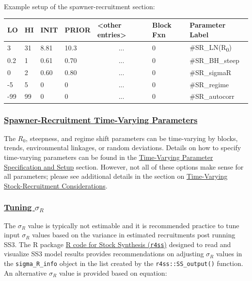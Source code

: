 Example setup of the spawner-recruitment section:
\begin{center}
	\begin{longtable}{p{1cm} p{1cm} p{1cm} p{1.5cm} p{3cm} p{2cm} p{3.5cm}}
		
		\hline
		LO \Tstrut & HI & INIT & PRIOR & <other entries> & Block Fxn & Parameter Label \Bstrut\\
		\hline
		3   & 31 & 8.81 & 10.3 & \multicolumn{1}{c}{...} & 0 & \#SR\_LN(R\textsubscript{0}) \Tstrut\\
		0.2 & 1  & 0.61 & 0.70 & \multicolumn{1}{c}{...} & 0 & \#SR\_BH\_steep \\
		0   & 2  & 0.60 & 0.80 & \multicolumn{1}{c}{...} & 0 & \#SR\_sigmaR \\
		-5  & 5  & 0    & 0    & \multicolumn{1}{c}{...} & 0 & \#SR\_regime \\
		-99 & 99 & 0    & 0    & \multicolumn{1}{c}{...} & 0 & \#SR\_autocorr \Bstrut\\
		\hline
	\end{longtable}
\end{center}
\vspace*{-1.7\baselineskip}

\hypertarget{SRR-TV}{}
\subsubsection[Spawner-Recruitment Time-Varying Parameters]{\protect\hyperlink{SRR-TV}{Spawner-Recruitment Time-Varying Parameters}}

The $R_{0}$, steepness, and regime shift parameters can be time-varying by blocks, trends, environmental linkages, or random deviations. Details on how to specify time-varying parameters can be found in the \hyperlink{tvOrder}{Time-Varying Parameter Specification and Setup} section. However, not all of these options make sense for all parameters; please see additional details in the section on \hyperlink{tv-sr}{Time-Varying Stock-Recruitment Considerations}.

\hypertarget{TuneSigmaR}{}
\subsubsection[Tuning $\sigma_R$]{\protect\hyperlink{TuneSigmaR}{Tuning $\sigma_R$}}
The $\sigma_R$ value is typically not estimable and it is recommended practice to tune input $\sigma_R$ values based on the variance in estimated recruitments post running SS3. The R package \href{https://github.com/r4ss/r4ss}{R code for Stock Synthesis (\texttt{r4ss})} designed to read and visualize SS3 model results provides recommendations on adjusting $\sigma_R$ values in the \texttt{sigma\_R\_info} object in the list created by the \texttt{r4ss::SS\_output()} function. An alternative $\sigma_R$ value is provided based on equation:

